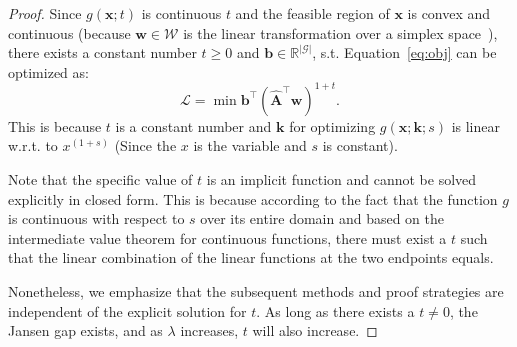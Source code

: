 \begin{proof}
    Since $g(\bm{x}; t)$ is continuous \wrt $t$ and the feasible region of $\bm{x}$ is convex and continuous (because $\bm{w}\in\mathcal{W}$ is the linear transformation over a simplex space~\citep{lindenstrauss1978poulsen}), there exists a constant number $t\ge 0$ and $\bm{b}\in\mathbb{R}^{|\mathcal{G}|}$,
    s.t.
    Equation~\eqref{eq:obj} can be optimized as:
    \[
        \mathcal{L} = \min \bm{b}^{\top}(\hat{\bm{A}}^{\top}\bm{w})^{1+t}.
    \]
    This is because $t$ is a constant number and $\bm{k}$ for optimizing $g(\bm{x}; \bm{k}; s)$ is linear w.r.t. to $x^{(1+s)}$ (Since the $x$ is the variable and $s$ is constant). 

    Note that the specific value of $t$ is an implicit function and cannot be solved explicitly in closed form. This is because according to the fact that the function $g$ is continuous with respect to $s$ over its entire domain and based on the intermediate value theorem for continuous functions, there must exist a $t$ such that the linear combination of the linear functions at the two endpoints equals.
    
    Nonetheless, we emphasize that the subsequent methods and proof strategies are independent of the explicit solution for $t$. As long as there exists a $t\neq0$, the Jansen gap exists, and as $\lambda$ increases, $t$ will also increase.
    
    


    
    
\end{proof}

